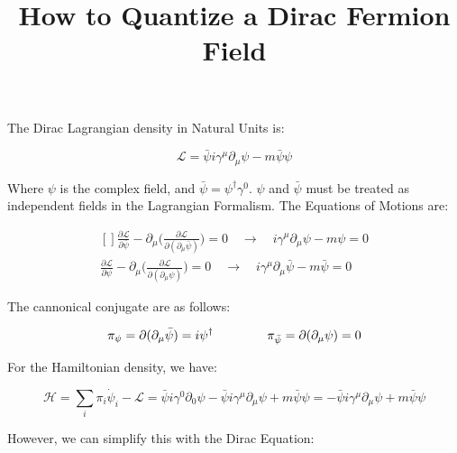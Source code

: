 \documentclass[a4]{article}
\begin{document}
    \title{How to Quantize a Dirac Fermion Field}
    \maketitle

    The Dirac Lagrangian density in Natural Units is:

    \begin{equation}
        \mathcal{L} = \bar{\psi} i \gamma^{\mu} \partial_{\mu} \psi - m \bar{\psi} \psi
    \end{equation}

    Where $\psi$ is the complex field, and $\bar{\psi} = \psi^{\dagger} \gamma^{0}$. $\psi$ and $\bar{\psi}$ must be
    treated as independent fields in the Lagrangian Formalism. The Equations of Motions are:
    
    \begin{equation}
        \begin{aligned}[]
            \frac{\partial \mathcal{L}}{\partial \bar{\psi}} - \partial_{\mu} \bigg( \frac{\partial \mathcal{L}}{\partial (\partial_{\mu} \bar{\psi})} \bigg) = 0 \quad \rightarrow \quad i \gamma^{\mu} \partial_{\mu} \psi - m \psi = 0 \\
            \frac{\partial \mathcal{L}}{\partial \psi} - \partial_{\mu} \bigg( \frac{\partial \mathcal{L}}{\partial (\partial_{\mu} \psi)} \bigg) = 0 \quad \rightarrow \quad i \gamma^{\mu} \partial_{\mu} \bar{\psi} - m \bar{\psi} = 0
        \end{aligned}
    \end{equation}

    The cannonical conjugate are as follows:

    \begin{equation}
        \pi_\psi = \partial (\partial_{\mu} \bar{\psi}) = i \psi^{\dagger} \hspace*{1.5cm} \pi_{\bar{\psi}} = \partial (\partial_{\mu} \psi) = 0
    \end{equation}

    For the Hamiltonian density, we have:

    \begin{equation}
        \mathcal{H} = \sum_{i} \pi_{i} \dot{\psi}_{i} - \mathcal{L} = \bar{\psi} i \gamma^{0} \partial_{0} \psi - \bar{\psi} i \gamma^{\mu} \partial_{\mu} \psi + m \bar{\psi} \psi = - \bar{\psi} i \gamma^{\mu} \partial_{\mu} \psi + m \bar{\psi} \psi
    \end{equation}

    However, we can simplify this with the Dirac Equation:
\end{document}
